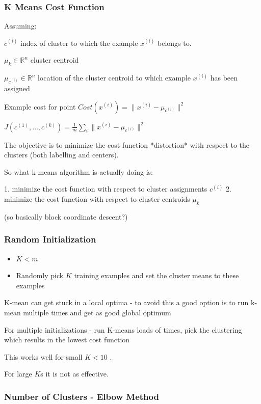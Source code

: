 {{\subsubsection{K Means Cost Function}

Assuming: 

$c^{(i)}$ index of cluster to which the example $x^{(i)}$ belongs to.

$\mu_k \in \mathbb R ^n $ cluster centroid 

$\mu_{c^{(i)}} \in \mathbb R ^n $ location of the cluster centroid to which example $x^{(i)}$ has been assigned

Example cost for point $Cost(x^{(i)}) = \|x^{(i)} - \mu_{c^{(i)}} \|^2$ 

$J(c^{(1)},\dots, c^{(k)})= \frac{1}{m}\sum_i \|x^{(i)} - \mu_{c^{(i)}} \|^2 $

The objective is to minimize the cost function *distortion* with respect to the clusters (both labelling and centers).

So what k-means algorithm is actually doing is:

1. minimize the cost function with respect to cluster assignments $c^{(i)}$
2. minimize the cost function with respect to cluster centroids $\mu_k$ 

(so basically block coordinate descent?)

\subsubsection{Random Initialization}

\begin{itemize}
\item $K < m$
\item Randomly pick $K$ training examples and set the cluster means to these examples
\end{itemize}

K-mean can get stuck in a local optima - to avoid this a good option is to run k-mean multiple times and get as good global optimum

For multiple initializations - run K-means loads of times, pick the clustering which results in the lowest cost function

This works well for small $K < 10$ .

For large $K$s it is not as effective.

\subsubsection{Number of Clusters - Elbow Method}

}}

